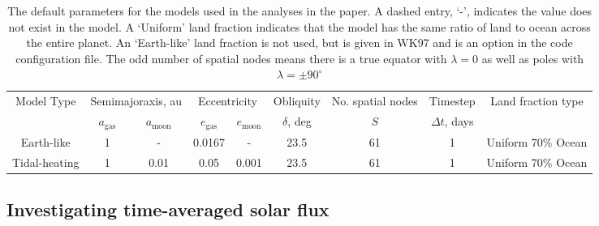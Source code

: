 \documentclass[12pt, onecolumn]{revtex4-2}    %
\begin{document}
\begin{table*}
    \begin{tabular}{|c|c|c|c|c|c|c|c|c|}
        \hline
        \multirow{2}{*}{Model Type} & \multicolumn{2}{|c|}{Semimajoraxis, au} & \multicolumn{2}{|c|}{Eccentricity} & Obliquity        & No. spatial nodes & Timestep      & \multirow{2}{*}{Land fraction type}                                         \\
        \cline{2-5}
                                    & $a_{\text{gas}}$                        & $a_{\text{moon}}$                  & $e_{\text{gas}}$ & $e_{\text{moon}}$ & $\delta$, deg & $S$                                 & $\Delta t$, days &                    \\
        \hline
        Earth-like                  & 1                                       & -                                  & 0.0167           & -                 & 23.5          & 61                                  & 1                & Uniform 70\% Ocean \\
        \hline
        Tidal-heating               & 1                                       & 0.01                               & 0.05             & 0.001             & 23.5          & 61                                  & 1                & Uniform 70\% Ocean \\
        \hline
    \end{tabular}
    \caption{The default parameters for the models used in the analyses in the paper.
        A dashed entry, `-', indicates the value does not exist in the model.
        A `Uniform' land fraction indicates that the model has the same ratio of land to ocean across the entire planet.
        An `Earth-like' land fraction is not used, but is given in WK97 \cite{WK97} and is an option in the code configuration file.
        The odd number of spatial nodes means there is a true equator with $\lambda = 0$ as well as poles with $\lambda = \pm 90^{\circ}$}
    \label{tab:default_params}
\end{table*}

\subsection{Investigating time-averaged solar flux} \label{ssec:single_param}
\end{document}
